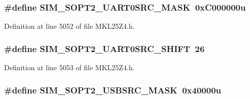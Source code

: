 \subsubsection[{\texorpdfstring{S\+I\+M\+\_\+\+S\+O\+P\+T2\+\_\+\+U\+A\+R\+T0\+S\+R\+C\+\_\+\+M\+A\+SK}{SIM_SOPT2_UART0SRC_MASK}}]{\setlength{\rightskip}{0pt plus 5cm}\#define S\+I\+M\+\_\+\+S\+O\+P\+T2\+\_\+\+U\+A\+R\+T0\+S\+R\+C\+\_\+\+M\+A\+SK~0x\+C000000u}\hypertarget{group___s_i_m___register___masks_ga9527f6a7148fe172b12a87e0b3b92492}{}\label{group___s_i_m___register___masks_ga9527f6a7148fe172b12a87e0b3b92492}


Definition at line 5052 of file M\+K\+L25\+Z4.\+h.

\subsubsection[{\texorpdfstring{S\+I\+M\+\_\+\+S\+O\+P\+T2\+\_\+\+U\+A\+R\+T0\+S\+R\+C\+\_\+\+S\+H\+I\+FT}{SIM_SOPT2_UART0SRC_SHIFT}}]{\setlength{\rightskip}{0pt plus 5cm}\#define S\+I\+M\+\_\+\+S\+O\+P\+T2\+\_\+\+U\+A\+R\+T0\+S\+R\+C\+\_\+\+S\+H\+I\+FT~26}\hypertarget{group___s_i_m___register___masks_ga0790a9307dcaad17166308eb2f1b62df}{}\label{group___s_i_m___register___masks_ga0790a9307dcaad17166308eb2f1b62df}


Definition at line 5053 of file M\+K\+L25\+Z4.\+h.

\subsubsection[{\texorpdfstring{S\+I\+M\+\_\+\+S\+O\+P\+T2\+\_\+\+U\+S\+B\+S\+R\+C\+\_\+\+M\+A\+SK}{SIM_SOPT2_USBSRC_MASK}}]{\setlength{\rightskip}{0pt plus 5cm}\#define S\+I\+M\+\_\+\+S\+O\+P\+T2\+\_\+\+U\+S\+B\+S\+R\+C\+\_\+\+M\+A\+SK~0x40000u}\hypertarget{group___s_i_m___register___masks_ga1caf7ffe2555eb59ed410110b6aba463}{}\label{group___s_i_m___register___masks_ga1caf7ffe2555eb59ed410110b6aba463}


